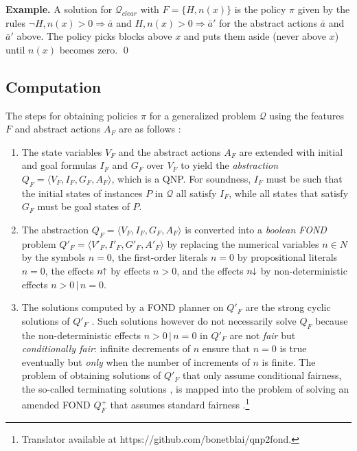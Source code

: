 \documentclass[letterpaper]{article} %
\newcommand{\tup}[1]{\langle #1 \rangle}
\newenvironment{example}{\noindent\textbf{Example.}\xspace}{\qed}
\newcommand{\Q}{\mathcal{Q}}
\newcommand{\Rule}[2]{\ensuremath{#1 \Rightarrow #2}}
\newcommand{\pplus}{\hspace{-.05em}\raisebox{.15ex}{\footnotesize$\uparrow$}}
\newcommand{\mminus}{\hspace{-.05em}\raisebox{.15ex}{\footnotesize$\downarrow$}}
\begin{document}
\medskip
\begin{example}
  A solution for $\Q_{clear}$ with   $F=\{H,n(x)\}$ is the policy $\pi$ given by the rules
  $\Rule{\neg H, n(x)>0}{\bar{a}}$ and $\Rule{H, n(x)>0}{\bar{a}'}$
  for the abstract actions $\bar{a}$ and $\bar{a}'$ above.
  The policy picks blocks above $x$ and puts them aside (never  above $x$)
  until $n(x)$ becomes zero.
\end{example}


\subsection{Computation}

The steps for obtaining policies $\pi$ for a generalized problem $\Q$
using the features $F$ and abstract actions $A_F$ are as follows \cite{bonet:ijcai2018}:

\begin{enumerate}[1.]
  \item The state variables $V_F$ and the abstract actions $A_F$ are
    extended with initial and goal formulas $I_F$ and $G_F$ over $V_F$
    to yield the \emph{abstraction}  $Q_F=\tup{V_F,I_F,G_F,A_F}$,
    which is a QNP. For soundness, $I_F$ must be such that
    the initial states of instances $P$ in $\Q$ all satisfy $I_F$, while
    all states that satisfy $G_F$ must be goal states of $P$.
%
  \item The abstraction $Q_F=\tup{V_F,I_F,G_F,A_F}$ is converted into a
    \emph{boolean FOND} problem $Q'_F=\tup{V'_F,I'_F,G'_F,A'_F}$ by
    replacing the numerical variables $n\in N$ by the symbols $n=0$,
    the first-order literals $n=0$ by propositional literals  $n=0$, 
    the effects $n\pplus$ by effects $n > 0$, and the
    effects $n\mminus$ by non-deterministic effects $n>0\,|\,n=0$.
%
  \item The solutions computed by a FOND planner on $Q'_F$ are the
    strong cyclic solutions of $Q'_F$ \cite{strong-cyclic}.
    Such solutions however do not necessarily solve $Q_F$ because the
    non-deterministic effects $n>0\,|\,n=0$ in $Q'_F$ are not \emph{fair} but
    \emph{conditionally fair}: infinite decrements of $n$ ensure that 
    $n=0$ is true eventually but \emph{only} when  the number of increments of $n$ is finite.
    The problem of obtaining solutions of $Q'_F$ that only assume conditional
    fairness, the so-called terminating solutions \cite{srivastava:aaai2011},
    is mapped into the problem of solving an amended FOND $Q^+_F$ that
    assumes standard  fairness \cite{bonet:ijcai2017}.\footnote{Translator
    available at https://github.com/bonetblai/qnp2fond.}
\end{enumerate}
\end{document}
